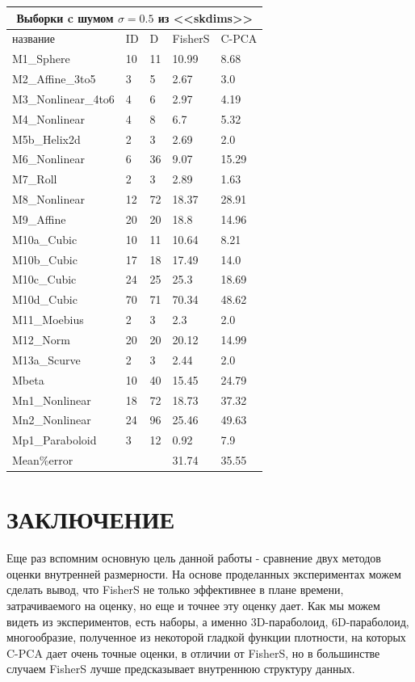 \documentclass[english, russian]{sobraep}
\begin{document}
\begin{tabular}{
p{2.4cm}|p{0.9cm}|p{0.9cm}|p{0.9cm}|p{0.9cm}}
 \hline
 \multicolumn{5}{c}{Выборки c шумом $\sigma = 0.5$ из <<skdims>>} \\
 \hline
 название & ID & D & FisherS& C-PCA\\
 \hline
M1_Sphere   & 10 & 11 & 10.99 & 8.68\\
M2_Affine_3to5   & 3 & 5 & 2.67 & 3.0\\
M3_Nonlinear_4to6   & 4 & 6 & 2.97 & 4.19\\
M4_Nonlinear   & 4 & 8 & 6.7 & 5.32\\
M5b_Helix2d   & 2 & 3 & 2.69 & 2.0\\
M6_Nonlinear   & 6 & 36 & 9.07 & 15.29\\
M7_Roll   & 2 & 3 & 2.89 & 1.63\\
M8_Nonlinear   & 12 & 72 & 18.37 & 28.91\\
M9_Affine   & 20 & 20 & 18.8 & 14.96\\
M10a_Cubic   & 10 & 11 & 10.64 & 8.21\\
M10b_Cubic   & 17 & 18 & 17.49 & 14.0\\
M10c_Cubic   & 24 & 25 & 25.3 & 18.69\\
M10d_Cubic   & 70 & 71 & 70.34 & 48.62\\
M11_Moebius   & 2 & 3 & 2.3 & 2.0\\
M12_Norm   & 20 & 20 & 20.12 & 14.99\\
M13a_Scurve   & 2 & 3 & 2.44 & 2.0\\
Mbeta   & 10 & 40 & 15.45 & 24.79\\
Mn1_Nonlinear   & 18 & 72 & 18.73 & 37.32\\
Mn2_Nonlinear   & 24 & 96 & 25.46 & 49.63\\
Mp1_Paraboloid   & 3 & 12 & 0.92 & 7.9\\
\hline
Mean\%error & & & 31.74 & 35.55\\
 \hline

\end{tabular}

\section{ЗАКЛЮЧЕНИЕ}
Еще раз вспомним основную цель данной работы - сравнение двух методов оценки внутренней размерности. На основе проделанных экспериментах можем сделать вывод, что FisherS не только эффективнее в плане времени, затрачиваемого на оценку, но еще и точнее эту оценку дает. Как мы можем видеть из экспериментов, есть наборы, а именно 3D-параболоид, 6D-параболоид, многообразие, полученное из некоторой гладкой функции плотности, на которых C-PCA дает очень точные оценки, в отличии от FisherS, но в большинстве случаем FisherS лучше предсказывает внутреннюю структуру данных.
\end{document}

